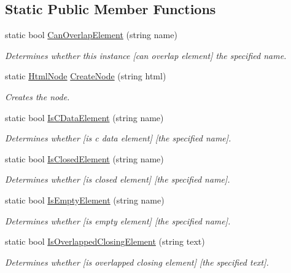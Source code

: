 \subsection*{Static Public Member Functions}
\begin{DoxyCompactItemize}
\item 
static bool \hyperlink{class_html_agility_pack_1_1_html_node_a2d50cc5b57ea2c85a032cc064bde24d2}{Can\+Overlap\+Element} (string name)
\begin{DoxyCompactList}\small\item\em Determines whether this instance \mbox{[}can overlap element\mbox{]} the specified name. \end{DoxyCompactList}\item 
static \hyperlink{class_html_agility_pack_1_1_html_node}{Html\+Node} \hyperlink{class_html_agility_pack_1_1_html_node_ab6a41df0b0ebcc6af2c39524119f5dfd}{Create\+Node} (string html)
\begin{DoxyCompactList}\small\item\em Creates the node. \end{DoxyCompactList}\item 
static bool \hyperlink{class_html_agility_pack_1_1_html_node_af33dfb76cce8949302d5f462cd85390f}{Is\+C\+Data\+Element} (string name)
\begin{DoxyCompactList}\small\item\em Determines whether \mbox{[}is c data element\mbox{]} \mbox{[}the specified name\mbox{]}. \end{DoxyCompactList}\item 
static bool \hyperlink{class_html_agility_pack_1_1_html_node_a1fcd4753675ee688b1d198c27fffcdac}{Is\+Closed\+Element} (string name)
\begin{DoxyCompactList}\small\item\em Determines whether \mbox{[}is closed element\mbox{]} \mbox{[}the specified name\mbox{]}. \end{DoxyCompactList}\item 
static bool \hyperlink{class_html_agility_pack_1_1_html_node_a291043d73de281deda489ca6ef8b3235}{Is\+Empty\+Element} (string name)
\begin{DoxyCompactList}\small\item\em Determines whether \mbox{[}is empty element\mbox{]} \mbox{[}the specified name\mbox{]}. \end{DoxyCompactList}\item 
static bool \hyperlink{class_html_agility_pack_1_1_html_node_ab5eb05dddf6f617bbfd64e9ab8b8d8c7}{Is\+Overlapped\+Closing\+Element} (string text)
\begin{DoxyCompactList}\small\item\em Determines whether \mbox{[}is overlapped closing element\mbox{]} \mbox{[}the specified text\mbox{]}. \end{DoxyCompactList}\end{DoxyCompactItemize}
